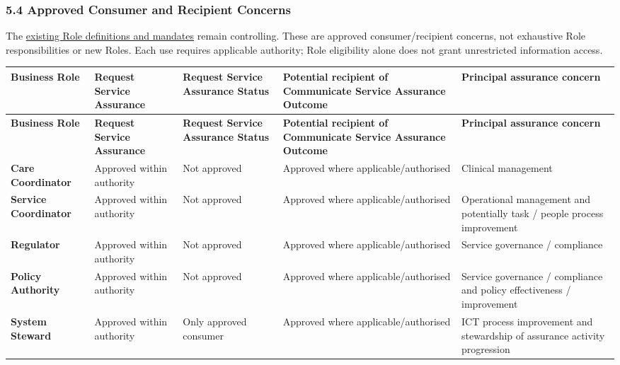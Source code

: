 \subsubsection*{5.4 Approved Consumer and Recipient Concerns}
\label{rad:assurance:200}

The \href{https://github.com/fhirfactory/harmonia/blob/98410db60155198a75f74c79d98060070209faa1/docs/markdown/03-business-architecture/actors-roles/roles.md}{existing Role definitions and mandates} remain controlling. These are approved consumer/\allowbreak{}recipient concerns, not exhaustive Role responsibilities or new Roles. Each use requires applicable authority; Role eligibility alone does not grant unrestricted information access.

\label{rad:assurance:202}
\begingroup\small\setlength{\TableWidth}{\dimexpr\linewidth-10\tabcolsep-6\arrayrulewidth\relax}
\begin{longtable}{|>{\raggedright\arraybackslash}p{0.2\TableWidth}|>{\raggedright\arraybackslash}p{0.2\TableWidth}|>{\raggedright\arraybackslash}p{0.2\TableWidth}|>{\raggedright\arraybackslash}p{0.2\TableWidth}|>{\raggedright\arraybackslash}p{0.2\TableWidth}|}
\hline\rowcolor{TableHead}\textbf{Business Role} & \textbf{Request Service Assurance} & \textbf{Request Service Assurance Status} & \textbf{Potential recipient of Communicate Service Assurance Outcome} & \textbf{Principal assurance concern}\\\hline\endfirsthead
\hline\rowcolor{TableHead}\textbf{Business Role} & \textbf{Request Service Assurance} & \textbf{Request Service Assurance Status} & \textbf{Potential recipient of Communicate Service Assurance Outcome} & \textbf{Principal assurance concern}\\\hline\endhead
\hline\endfoot
\textbf{Care Coordinator} & Approved within authority & Not approved & Approved where applicable/\allowbreak{}authorised & Clinical management\\\hline
\textbf{Service Coordinator} & Approved within authority & Not approved & Approved where applicable/\allowbreak{}authorised & Operational management and potentially task /\allowbreak{} people process improvement\\\hline
\textbf{Regulator} & Approved within authority & Not approved & Approved where applicable/\allowbreak{}authorised & Service governance /\allowbreak{} compliance\\\hline
\textbf{Policy Authority} & Approved within authority & Not approved & Approved where applicable/\allowbreak{}authorised & Service governance /\allowbreak{} compliance and policy effectiveness /\allowbreak{} improvement\\\hline
\textbf{System Steward} & Approved within authority & Only approved consumer & Approved where applicable/\allowbreak{}authorised & ICT process improvement and stewardship of assurance activity progression\\\hline
\end{longtable}\endgroup
{}\label{rad:assurance:210}

